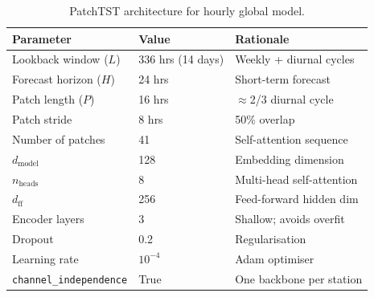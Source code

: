 \documentclass[11pt,a4paper]{article}
\begin{document}
\begin{table}[H]
    \centering
    \caption{PatchTST architecture for hourly global model.}
    \begin{tabular}{lll}
        \toprule
        \textbf{Parameter} & \textbf{Value} & \textbf{Rationale} \\
        \midrule
        Lookback window ($L$)    & 336 hrs (14 days)  & Weekly + diurnal cycles \\
        Forecast horizon ($H$)   & 24 hrs             & Short-term forecast \\
        Patch length ($P$)       & 16 hrs             & $\approx$2/3 diurnal cycle \\
        Patch stride             & 8 hrs              & 50\% overlap \\
        Number of patches        & 41                 & Self-attention sequence \\
        $d_{\mathrm{model}}$     & 128                & Embedding dimension \\
        $n_{\mathrm{heads}}$     & 8                  & Multi-head self-attention \\
        $d_{\mathrm{ff}}$        & 256                & Feed-forward hidden dim \\
        Encoder layers           & 3                  & Shallow; avoids overfit \\
        Dropout                  & 0.2                & Regularisation \\
        Learning rate            & $10^{-4}$          & Adam optimiser \\
        \texttt{channel\_independence} & True        & One backbone per station \\
        \bottomrule
    \end{tabular}
\end{table}
\end{document}
